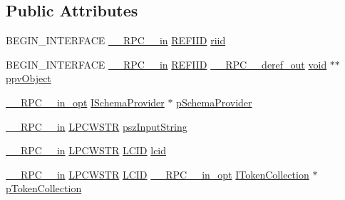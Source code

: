 \subsection*{Public Attributes}
\begin{DoxyCompactItemize}
\item 
B\+E\+G\+I\+N\+\_\+\+I\+N\+T\+E\+R\+F\+A\+CE \hyperlink{rpcsal_8h_a20b7f6da600a05c8b541659f14f7f0e6}{\+\_\+\+\_\+\+R\+P\+C\+\_\+\+\_\+in} \hyperlink{px__win__ds_8c_a80ec49c8ae61e234197d5071d2df497d}{R\+E\+F\+I\+ID} \hyperlink{struct_i_condition_generator_vtbl_a375f47e2b87cc7a1c052c9f495f33fb0}{riid}
\item 
B\+E\+G\+I\+N\+\_\+\+I\+N\+T\+E\+R\+F\+A\+CE \hyperlink{rpcsal_8h_a20b7f6da600a05c8b541659f14f7f0e6}{\+\_\+\+\_\+\+R\+P\+C\+\_\+\+\_\+in} \hyperlink{px__win__ds_8c_a80ec49c8ae61e234197d5071d2df497d}{R\+E\+F\+I\+ID} \hyperlink{rpcsal_8h_a23bc188526f10656f9c79d950f6c3192}{\+\_\+\+\_\+\+R\+P\+C\+\_\+\+\_\+deref\+\_\+out} \hyperlink{sound_8c_ae35f5844602719cf66324f4de2a658b3}{void} $\ast$$\ast$ \hyperlink{struct_i_condition_generator_vtbl_a2966f7d014ecacc1a3ba0925075cfcac}{ppv\+Object}
\item 
\hyperlink{rpcsal_8h_a6e152ac84637d70f0453366759b3b9fb}{\+\_\+\+\_\+\+R\+P\+C\+\_\+\+\_\+in\+\_\+opt} \hyperlink{structuredquery_8h_afffb1fb827b569b0b58a1ba88756a965}{I\+Schema\+Provider} $\ast$ \hyperlink{struct_i_condition_generator_vtbl_a56ac16fcad4f676b514fa7c3b581764c}{p\+Schema\+Provider}
\item 
\hyperlink{rpcsal_8h_a20b7f6da600a05c8b541659f14f7f0e6}{\+\_\+\+\_\+\+R\+P\+C\+\_\+\+\_\+in} \hyperlink{mapinls_8h_a25fda90f83ded0efd5456a4e7eda1e0c}{L\+P\+C\+W\+S\+TR} \hyperlink{struct_i_condition_generator_vtbl_a44dfba63ee2165e107db360a7b5e7272}{psz\+Input\+String}
\item 
\hyperlink{rpcsal_8h_a20b7f6da600a05c8b541659f14f7f0e6}{\+\_\+\+\_\+\+R\+P\+C\+\_\+\+\_\+in} \hyperlink{mapinls_8h_a25fda90f83ded0efd5456a4e7eda1e0c}{L\+P\+C\+W\+S\+TR} \hyperlink{mapinls_8h_aad243bba501745d51f6a670ade640986}{L\+C\+ID} \hyperlink{struct_i_condition_generator_vtbl_af56fb8d8aa34641e6e49499c8f636e8f}{lcid}
\item 
\hyperlink{rpcsal_8h_a20b7f6da600a05c8b541659f14f7f0e6}{\+\_\+\+\_\+\+R\+P\+C\+\_\+\+\_\+in} \hyperlink{mapinls_8h_a25fda90f83ded0efd5456a4e7eda1e0c}{L\+P\+C\+W\+S\+TR} \hyperlink{mapinls_8h_aad243bba501745d51f6a670ade640986}{L\+C\+ID} \hyperlink{rpcsal_8h_a6e152ac84637d70f0453366759b3b9fb}{\+\_\+\+\_\+\+R\+P\+C\+\_\+\+\_\+in\+\_\+opt} \hyperlink{structuredquery_8h_af02e566d558cb1e53b43313cb871ce87}{I\+Token\+Collection} $\ast$ \hyperlink{struct_i_condition_generator_vtbl_a7d60355ecfbbc069adb46708e36deb71}{p\+Token\+Collection}
$$
\end{DoxyCompactItemize}
